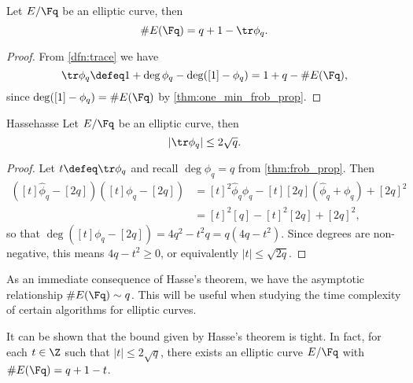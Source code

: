 \begin{thm}{}{}
Let $E / \Fq$ be an elliptic curve, then
\[
\#E(\Fq) = q + 1 - \tr \phi_q.
\]
\end{thm}
\begin{proof}
From \cref{dfn:trace} we have \[\tr\phi_q \defeq 1 + \deg \phi_q - \deg([1] - \phi_q) = 1 + q - \#E(\Fq),\] since $\deg([1] - \phi_q) = \#E(\Fq)$ by \cref{thm:one_min_frob_prop}.
\end{proof}

\begin{thm}{Hasse}{hasse}
Let $E / \Fq$ be an elliptic curve, then
\[
\left|\tr \phi_q\right| \leq 2\sqrt{q}.
\]
\end{thm}
\begin{proof}
Let $t \defeq \tr \phi_q$ and recall $\deg \phi_q = q$ from \cref{thm:frob_prop}. Then
\begin{align*}
([t] \hat{\phi}_q - [2q]) ([t] \phi_q - [2q]) &= [t]^2 \hat{\phi}_q \phi_q - [t] [2q] (\hat{\phi}_q + \phi_q) + [2q]^2 \\
&= [t]^2[q] - [t]^2[2q] + [2q]^2,
\end{align*}
so that $\deg([t] \phi_q - [2q]) = 4q^2 - t^2q = q(4q - t^2)$. Since degrees are non-negative, this means $4 q - t^2 \geq 0$, or equivalently $\left|t\right| \leq \sqrt{2q}$.
\end{proof}

As an immediate consequence of Hasse's theorem, we have the asymptotic relationship $\#E(\Fq) \sim q$. This will be useful when studying the time complexity of certain algorithms for elliptic curves.

It can be shown that the bound given by Hasse's theorem is tight. In fact, for each $t \in \Z$ such that $|t| \leq 2\sqrt{q}$, there exists an elliptic curve $E / \Fq$ with $\#E(\Fq) = q + 1 - t$.
